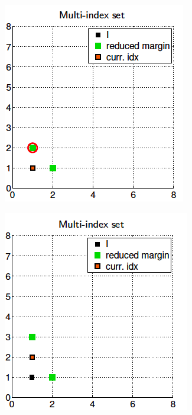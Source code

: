 \begin{figure}[htb]
\begin{subfigure}{0.165\textwidth}
 		\caption{}
 		\label{fig:2}
 	\end{subfigure}\hfil %
 	\begin{subfigure}{0.165\textwidth}
 		\includegraphics[width=\linewidth]{./figures/MISC_construction/3}
 		\caption{}
 		\label{fig:3}
 	\end{subfigure}
 	\medskip
 	\begin{subfigure}{0.165\textwidth}
 		\includegraphics[width=\linewidth]{./figures/MISC_construction/4}

\end{subfigure}
\end{figure}
